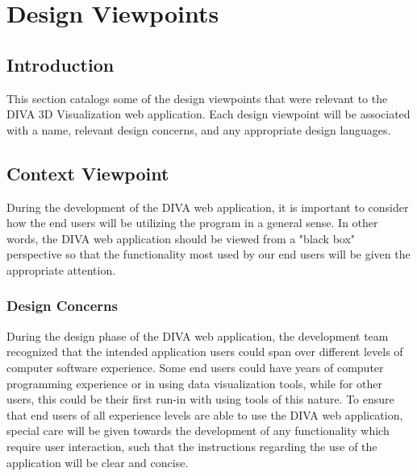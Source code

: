 \documentclass[journal,10pt,onecolumn,compsoc]{IEEEtran} \usepackage[margin=1.0in]{geometry} \usepackage{pdfpages}
\begin{document}
\section{Design Viewpoints}
    \subsection{Introduction}
    This section catalogs some of the design viewpoints that were relevant to the DIVA 3D  Visualization web application. Each design viewpoint will be associated with a name, relevant design concerns, and any appropriate design languages. 
    \subsection{Context Viewpoint}
    During the development of the DIVA web application, it is important to consider how the end users will be utilizing the program in a general sense. In other words, the DIVA web application should be viewed from a "black box" perspective so that the functionality most used by our end users will be given the appropriate attention.
        \subsubsection{Design Concerns}
        During the design phase of the DIVA web application, the development team recognized that the intended application users could span over different levels of computer software experience. Some end users could have years of computer programming experience or in using data visualization tools, while for other users, this could be their first run-in with using tools of this nature. To ensure that end users of all experience levels are able to use the DIVA web application, special care will be given towards the development of any functionality which require user interaction, such that the instructions regarding the use of the application will be clear and concise. 
\end{document}
